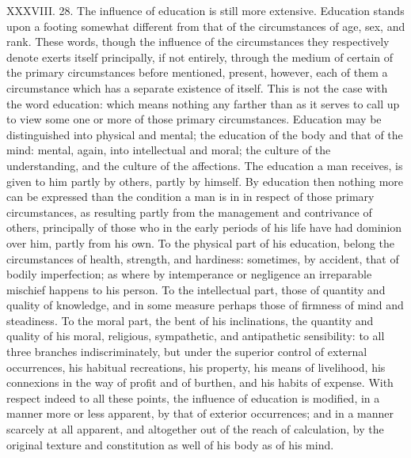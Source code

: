 \documentclass[12pt]{report}
\begin{document}
XXXVIII. 28. The influence of education is still more extensive.
Education stands upon a footing somewhat different from that of the
circumstances of age, sex, and rank. These words, though the influence
of the circumstances they respectively denote exerts itself principally,
if not entirely, through the medium of certain of the primary
circumstances before mentioned, present, however, each of them a
circumstance which has a separate existence of itself. This is not the
case with the word education: which means nothing any farther than as it
serves to call up to view some one or more of those primary
circumstances. Education may be distinguished into physical and mental;
the education of the body and that of the mind: mental, again, into
intellectual and moral; the culture of the understanding, and the
culture of the affections. The education a man receives, is given to him
partly by others, partly by himself. By education then nothing more can
be expressed than the condition a man is in in respect of those primary
circumstances, as resulting partly from the management and contrivance
of others, principally of those who in the early periods of his life
have had dominion over him, partly from his own. To the physical part of
his education, belong the circumstances of health, strength, and
hardiness: sometimes, by accident, that of bodily imperfection; as where
by intemperance or negligence an irreparable mischief happens to his
person. To the intellectual part, those of quantity and quality of
knowledge, and in some measure perhaps those of firmness of mind and
steadiness. To the moral part, the bent of his inclinations, the
quantity and quality of his moral, religious, sympathetic, and
antipathetic sensibility: to all three branches indiscriminately, but
under the superior control of external occurrences, his habitual
recreations, his property, his means of livelihood, his connexions in
the way of profit and of burthen, and his habits of expense. With
respect indeed to all these points, the influence of education is
modified, in a manner more or less apparent, by that of exterior
occurrences; and in a manner scarcely at all apparent, and altogether
out of the reach of calculation, by the original texture and
constitution as well of his body as of his mind.
\end{document}
